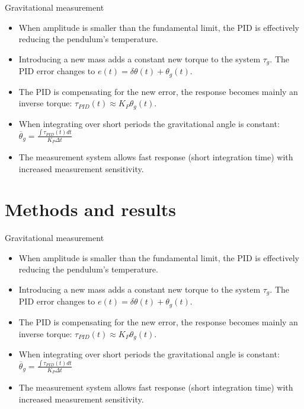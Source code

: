 \documentclass{beamer}
\begin{document}
\begin{frame}{Gravitational measurement}
	\begin{itemize}
		
		
		\item When amplitude is smaller than the fundamental limit, the PID is effectively reducing the pendulum's temperature. 
		\pause
		\item Introducing a new mass adds a constant new torque to the system $\tau_g$. The PID error changes to $e(t) = \delta\theta(t) + \theta_g(t)$.
		\item The PID is compensating for the new error, the response becomes mainly an inverse torque: $\tau_{PID}(t) \approx K_P\theta_g(t)$. 
		\item When integrating over short periods the gravitational angle is constant: $\overline{\theta}_g =  \frac{\int \tau_{PID}(t) dt}{ K_P \Delta t} $
		\pause
		\item The measurement system allows fast response (short integration time) with increased measurement sensitivity.
		
	\end{itemize}
\end{frame}

\section{Methods and results}
\begin{frame}{Gravitational measurement}
	\begin{itemize}
		
		
		\item When amplitude is smaller than the fundamental limit, the PID is effectively reducing the pendulum's temperature. 
		\pause
		\item Introducing a new mass adds a constant new torque to the system $\tau_g$. The PID error changes to $e(t) = \delta\theta(t) + \theta_g(t)$.
		\item The PID is compensating for the new error, the response becomes mainly an inverse torque: $\tau_{PID}(t) \approx K_P\theta_g(t)$. 
		\item When integrating over short periods the gravitational angle is constant: $\overline{\theta}_g =  \frac{\int \tau_{PID}(t) dt}{ K_P \Delta t} $
		\pause
		\item The measurement system allows fast response (short integration time) with increased measurement sensitivity.
		
	\end{itemize}
\end{frame}
\end{document}
